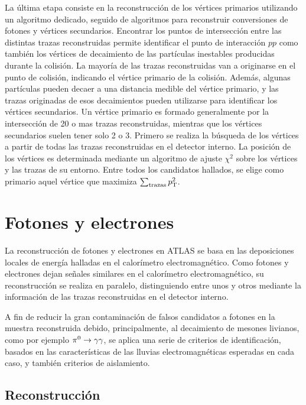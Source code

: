 La última etapa consiste en la reconstrucción de los vértices primarios
utilizando un algoritmo dedicado, seguido de algoritmos para reconstruir
conversiones de fotones y vértices secundarios.
Encontrar los puntos de intersección entre las distintas trazas reconstruidas
permite identificar el punto de interacción $pp$ como también los vértices de
decaimiento de las partículas inestables producidas durante la colisión. La
mayoría de las trazas reconstruidas van a originarse en el punto de colisión,
indicando el vértice primario de la colisión. Además, algunas partículas pueden
decaer a una distancia medible del vértice primario, y las trazas originadas de
esos decaimientos pueden utilizarse para identificar los vértices secundarios.
Un vértice primario es formado generalmente por la intersección de 20 o mas
trazas reconstruidas, mientras que los vértices secundarios suelen tener solo 2
o 3. Primero se realiza la búsqueda de los vértices a partir de todas las trazas
reconstruidas en el detector interno. La posición de los vértices es determinada
mediante un algoritmo de ajuste $\chi^2$ sobre los vértices y las trazas de su
entorno. Entre todos los candidatos hallados, se elige como primario aquel
vértice que maximiza $\sum_{\text{trazas}} p_{\mathrm{T}}^2$.



\section{Fotones y electrones}
\label{sec:obj_photons}

La reconstrucción de fotones y electrones en ATLAS se basa en las deposiciones
locales de energía halladas en el calorímetro electromagnético. Como fotones y
electrones dejan señales similares en el calorímetro electromagnético, su
reconstrucción se realiza en paralelo, distinguiendo entre unos y otros
mediante la información de las trazas reconstruidas en el detector
interno.

A fin de reducir la gran contaminación de falsos candidatos a fotones en la
muestra reconstruida debido, principalmente, al decaimiento de mesones livianos,
como por ejemplo $\pi^0 \to \gam\gam$, se aplica una serie de criterios de
identificación, basados en las características de las lluvias electromagnéticas
esperadas en cada caso, y también criterios de aislamiento.


\subsection{Reconstrucción}

